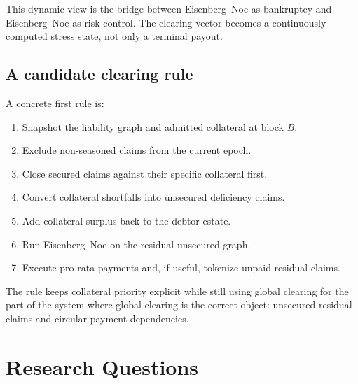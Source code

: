 \documentclass[11pt,oneside]{article}
\begin{document}
This dynamic view is the bridge between Eisenberg--Noe as bankruptcy and
Eisenberg--Noe as risk control. The clearing vector becomes a continuously
computed stress state, not only a terminal payout.

\subsection{A candidate clearing rule}

A concrete first rule is:

\begin{enumerate}[leftmargin=1.5em]
  \item Snapshot the liability graph and admitted collateral at block $B$.
  \item Exclude non-seasoned claims from the current epoch.
  \item Close secured claims against their specific collateral first.
  \item Convert collateral shortfalls into unsecured deficiency claims.
  \item Add collateral surplus back to the debtor estate.
  \item Run Eisenberg--Noe on the residual unsecured graph.
  \item Execute pro rata payments and, if useful, tokenize unpaid residual
  claims.
\end{enumerate}

The rule keeps collateral priority explicit while still using global clearing
for the part of the system where global clearing is the correct object:
unsecured residual claims and circular payment dependencies.

\section{Research Questions}
\end{document}
